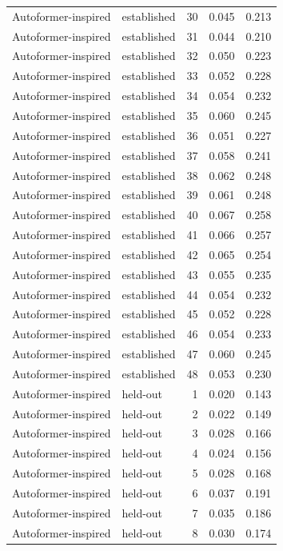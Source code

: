 \begin{tabular}{llrrr}
Autoformer-inspired & established & 30 & 0.045 & 0.213 \\
Autoformer-inspired & established & 31 & 0.044 & 0.210 \\
Autoformer-inspired & established & 32 & 0.050 & 0.223 \\
Autoformer-inspired & established & 33 & 0.052 & 0.228 \\
Autoformer-inspired & established & 34 & 0.054 & 0.232 \\
Autoformer-inspired & established & 35 & 0.060 & 0.245 \\
Autoformer-inspired & established & 36 & 0.051 & 0.227 \\
Autoformer-inspired & established & 37 & 0.058 & 0.241 \\
Autoformer-inspired & established & 38 & 0.062 & 0.248 \\
Autoformer-inspired & established & 39 & 0.061 & 0.248 \\
Autoformer-inspired & established & 40 & 0.067 & 0.258 \\
Autoformer-inspired & established & 41 & 0.066 & 0.257 \\
Autoformer-inspired & established & 42 & 0.065 & 0.254 \\
Autoformer-inspired & established & 43 & 0.055 & 0.235 \\
Autoformer-inspired & established & 44 & 0.054 & 0.232 \\
Autoformer-inspired & established & 45 & 0.052 & 0.228 \\
Autoformer-inspired & established & 46 & 0.054 & 0.233 \\
Autoformer-inspired & established & 47 & 0.060 & 0.245 \\
Autoformer-inspired & established & 48 & 0.053 & 0.230 \\
Autoformer-inspired & held-out & 1 & 0.020 & 0.143 \\
Autoformer-inspired & held-out & 2 & 0.022 & 0.149 \\
Autoformer-inspired & held-out & 3 & 0.028 & 0.166 \\
Autoformer-inspired & held-out & 4 & 0.024 & 0.156 \\
Autoformer-inspired & held-out & 5 & 0.028 & 0.168 \\
Autoformer-inspired & held-out & 6 & 0.037 & 0.191 \\
Autoformer-inspired & held-out & 7 & 0.035 & 0.186 \\
Autoformer-inspired & held-out & 8 & 0.030 & 0.174 \\

\end{tabular}
